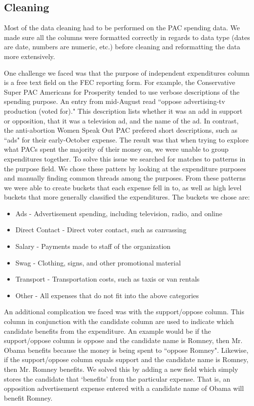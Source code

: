 \documentclass[11pt]{article}\usepackage{graphicx, color}
\begin{document}
\subsection{Cleaning}
Most of the data cleaning had to be performed on the PAC spending data. We made sure all the columns were formatted correctly in regards to data type (dates are date, numbers are numeric, etc.) before cleaning and reformatting the data more extensively. 

One challenge we faced was that the purpose of independent expenditures column is a free text field on the FEC reporting form. For example, the Conservative Super PAC Americans for Prosperity tended to use verbose descriptions of the spending purpose.  An entry from mid-August read ``oppose advertising-tv production (voted for)."  This description lists whether it was an add in support or opposition, that it was a television ad, and the name of the ad. In contrast, the anti-abortion Women Speak Out PAC prefered short descriptions, such as ``ads" for their early-October expense. The result was that when trying to explore what PACs spent the majority of their money on, we were unable to group expenditures together. To solve this issue we searched for matches to patterns in the purpose field. We chose these patters by looking at the expenditure purposes and manually finding common threads among the purposes. From these patterns we were able to create buckets that each expense fell in to, as well as high level buckets that more generally classified the expenditures.  The buckets we chose are: 

\begin{itemize}
    \item Ads - Advertisement spending, including television, radio, and online
    \item Direct Contact - Direct voter contact, such as canvassing
    \item Salary - Payments made to staff of the organization
    \item Swag - Clothing, signs, and other promotional material
    \item Transport - Transportation costs, such as taxis or van rentals
    \item Other - All expenses that do not fit into the above categories
\end{itemize}

An additional complication we faced was with the support/oppose column. This column in conjunction with the candidate column are used to indicate which candidate benefits from the expenditure. An example would be if the support/oppose column is oppose and the candidate name is Romney, then Mr. Obama benefits because the money is being spent to ``oppose Romney". Likewise, if the support/oppose column equals support and the candidate name is Romney, then Mr. Romney benefits.  We solved this by adding a new field which simply stores the candidate that `benefits' from the particular expense.  That is, an opposition advertisement expense entered with a candidate name of Obama will benefit Romney.
\end{document}
